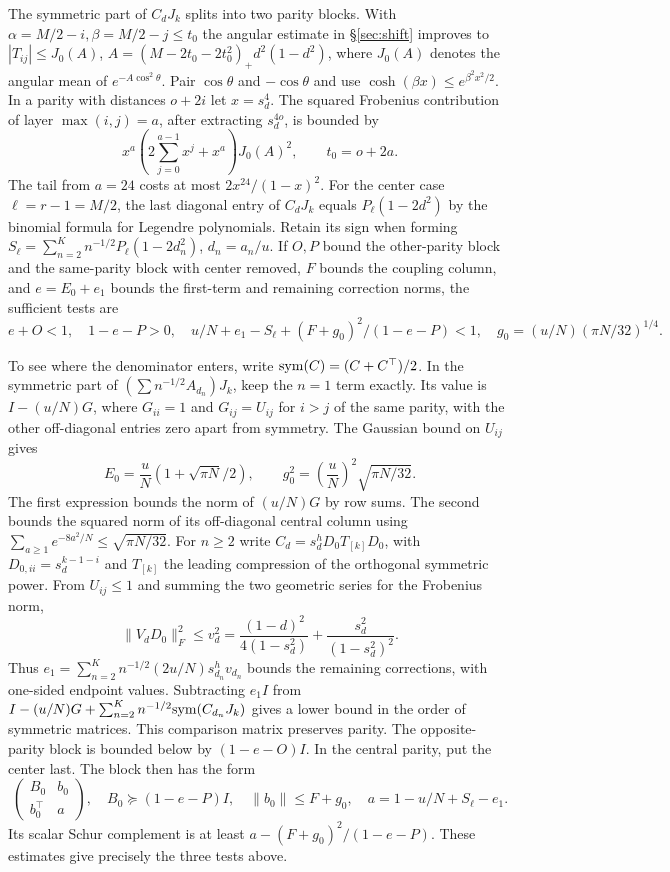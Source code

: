\documentclass[11pt,a4paper,reqno]{amsart}
\numberwithin{equation}{section}
\begin{document}
The symmetric part of \(C_dJ_k\) splits into two parity blocks. With \(\alpha=M/2-i,\beta=M/2-j\le t_0\) the angular estimate in \S\ref{sec:shift} improves to \(|T_{ij}|\le J_0(A)\), \(A=(M-2t_0-2t_0^2)_+d^2(1-d^2)\), where \(J_0(A)\) denotes the angular mean of \(e^{-A\cos^2\theta}\). Pair \(\cos\theta\) and \(-\cos\theta\) and use \(\cosh(\beta x)\le e^{\beta^2x^2/2}\). In a parity with distances \(o+2i\) let \(x=s_d^4\). The squared Frobenius contribution of layer \(\max(i,j)=a\), after extracting \(s_d^{4o}\), is bounded by \[x^a\left(2\sum_{j=0}^{a-1}x^j+x^a\right)J_0(A)^2,\qquad t_0=o+2a.\] The tail from \(a=24\) costs at most \(2x^{24}/(1-x)^2\). For the center case \(\ell=r-1=M/2\), the last diagonal entry of \(C_dJ_k\) equals \(P_\ell(1-2d^2)\) by the binomial formula for Legendre polynomials. Retain its sign when forming \(S_\ell=\sum_{n=2}^K n^{-1/2}P_\ell(1-2d_n^2)\), \(d_n=a_n/u\). If \(O,P\) bound the other-parity block and the same-parity block with center removed, \(F\) bounds the coupling column, and \(e=E_0+e_1\) bounds the first-term and remaining correction norms, the sufficient tests are \[e+O<1,\quad 1-e-P>0,\quad
u/N+e_1-S_\ell+(F+g_0)^2/(1-e-P)<1,\quad g_0=(u/N)(\pi N/32)^{1/4}.\]

To see where the denominator enters, write \({\rm sym}(C)=(C+C^\top)/2\). In the symmetric part of \((\sum n^{-1/2}A_{d_n})J_k\), keep the \(n=1\) term exactly. Its value is \(I-(u/N)G\), where \(G_{ii}=1\) and \(G_{ij}=U_{ij}\) for \(i>j\) of the same parity, with the other off-diagonal entries zero apart from symmetry. The Gaussian bound on \(U_{ij}\) gives
\[
 E_0=\frac{u}{N}(1+\sqrt{\pi N}/2),\qquad
 g_0^2=\left(\frac{u}{N}\right)^2\sqrt{\pi N/32}.
\]
The first expression bounds the norm of \((u/N)G\) by row sums. The second bounds the squared norm of its off-diagonal central column using \(\sum_{a\ge1}e^{-8a^2/N}\le\sqrt{\pi N/32}\). For \(n\ge2\) write \(C_d=s_d^hD_0 T_{[k]}D_0\), with \(D_{0,ii}=s_d^{k-1-i}\) and \(T_{[k]}\) the leading compression of the orthogonal symmetric power. From \(U_{ij}\le1\) and summing the two geometric series for the Frobenius norm,
\[
 \|V_dD_0\|_F^2\le v_d^2
 =\frac{(1-d)^2}{4(1-s_d^2)}+\frac{s_d^2}{(1-s_d^2)^2}.
\]
Thus \(e_1=\sum_{n=2}^K n^{-1/2}(2u/N)s_{d_n}^h v_{d_n}\) bounds the remaining corrections, with one-sided endpoint values. Subtracting \(e_1 I\) from \(I-(u/N)G+\sum_{n=2}^K n^{-1/2}{\rm sym}(C_{d_n}J_k)\) gives a lower bound in the order of symmetric matrices. This comparison matrix preserves parity. The opposite-parity block is bounded below by \((1-e-O)I\). In the central parity, put the center last. The block then has the form
\[
 \begin{pmatrix} B_0&b_0\\ b_0^\top&a\end{pmatrix},\quad
 B_0\succeq(1-e-P)I,\quad\|b_0\|\le F+g_0,\quad
 a=1-u/N+S_\ell-e_1 .
\]
Its scalar Schur complement is at least \(a-(F+g_0)^2/(1-e-P)\). These estimates give precisely the three tests above.
\end{document}

